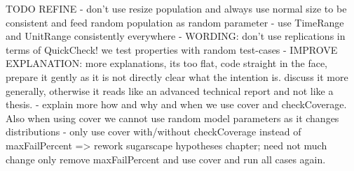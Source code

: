 TODO REFINE
- don't use resize population and always use normal size to be consistent and feed random population as random parameter
- use TimeRange and UnitRange consistently everywhere
- WORDING: don't use replications in terms of QuickCheck! we test properties with random test-cases
- IMPROVE EXPLANATION: more explanations, its too flat, code straight in the face, prepare it gently as it is not directly clear what the intention is. discuss it more generally, otherwise it reads like an advanced technical report and not like a thesis.
- explain more how and why and when we use cover and checkCoverage. Also when using cover we cannot use random model parameters as it changes distributions
- only use cover with/without checkCoverage instead of maxFailPercent => rework sugarscape hypotheses chapter; need not much change only remove maxFailPercent and use cover and run all cases again.

\bigskip





%












